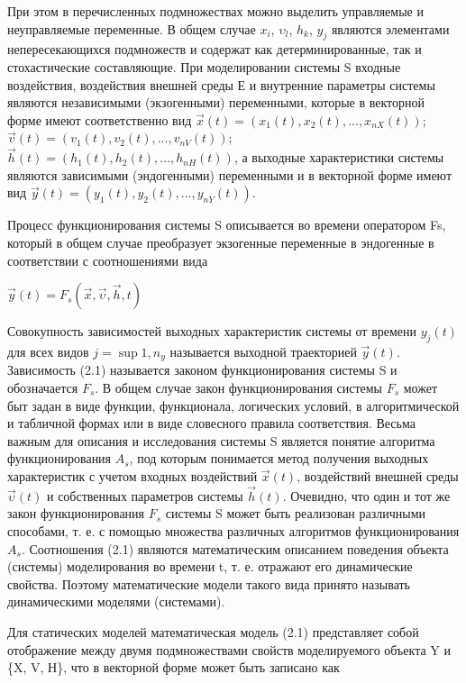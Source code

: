   При этом в перечисленных подмножествах можно выделить управляемые и неуправляемые переменные. В общем случае $x_{i}$, $\upsilon_{l}$, $h_{k}$, $y_{j}$ являются элементами непересекающихся подмножеств и содержат как детерминированные, так и стохастические составляющие. При моделировании системы S входные воздействия, воздействия внешней среды Е и внутренние параметры системы являются независимыми (экзогенными) переменными, которые в векторной форме имеют соответственно вид $\vec{x}(t) = (x_{1}(t), x_{2}(t), ..., x_{nX}(t))$; $\vec{v}(t) = (v_{1}(t), v_{2}(t), ... , v_{nV}(t))$; $\vec{h}(t) = (h_{1}(t), h_{2}(t), ... , h_{nH}(t))$, а выходные характеристики системы являются зависимыми (эндогенными) переменными и в векторной форме имеют вид $\vec{y}(t) = (y_{1}(t), y_{2}(t), ... , y_{nY}(t))$.

  Процесс функционирования системы S описывается во времени оператором Fs, который в общем случае преобразует экзогенные переменные в эндогенные в соответствии с соотношениями вида

  \begin{center}
    $\vec{y}(t) = F_{s}(\vec{x}, \vec{\upsilon}, \vec{h}, t)$
  \end{center}

  Совокупность зависимостей выходных характеристик системы от времени $y_{j}(t)$ для всех видов $j = \sup{1, n_{y}}$ называется выходной траекторией $\vec{y}(t)$. Зависимость (2.1) называется законом функционирования системы S и обозначается $F_{s}$. В общем случае закон функционирования системы $F_{s}$ может быт задан в виде функции, функционала, логических условий, в алгоритмической и табличной формах или в виде словесного правила соответствия. Весьма важным для описания и исследования системы S является понятие алгоритма функционирования $A_{s}$, под которым понимается метод получения выходных характеристик с учетом входных воздействий $\vec{x}(t)$, воздействий внешней среды $\vec{\upsilon}(t)$ и собственных параметров системы $\vec{h}(t)$. Очевидно, что один и тот же закон функционирования $F_{s}$ системы S может быть реализован различными способами, т. е. с помощью множества различных алгоритмов функционирования $A_{s}$. Соотношения (2.1) являются математическим описанием поведения объекта (системы) моделирования во времени t, т. е. отражают его динамические свойства. Поэтому математические модели такого вида принято называть динамическими моделями (системами).

  Для статических моделей математическая модель (2.1) представляет собой отображение между двумя подмножествами свойств моделируемого объекта Y и \{X, V, Н\}, что в векторной форме может быть записано как

